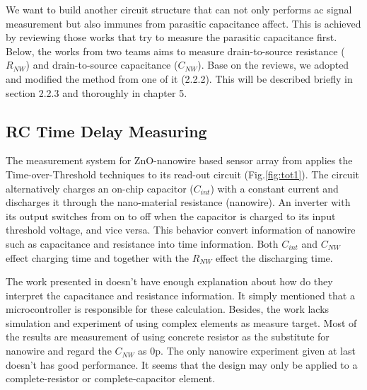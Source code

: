 We want to build another circuit structure that can not only performs ac signal measurement but also immunes from parasitic capacitance affect.
This is achieved by reviewing those works that try to measure the parasitic capacitance first.
Below, the works from two teams aims to measure drain-to-source resistance ($R_{NW}$) and drain-to-source capacitance ($C_{NW}$).
Base on the reviews, we adopted and modified the method from one of it (2.2.2).
This will be described briefly in section 2.2.3 and thoroughly in chapter 5.

\subsection{RC Time Delay Measuring}
The measurement system for ZnO-nanowire based sensor array from \cite{Juv1} applies the Time-over-Threshold techniques to its read-out circuit (Fig.\ref{fig:tot1}).
The circuit alternatively charges an on-chip capacitor ($C_{int}$) with a constant current and discharges it through the nano-material resistance (nanowire).
An inverter with its output switches from on to off when the capacitor is charged to its input threshold voltage, and vice versa.
This behavior convert information of nanowire such as capacitance and resistance into time information.
Both $C_{int}$ and $C_{NW}$ effect charging time and together with the $R_{NW}$ effect the discharging time.

The work presented in \cite{Juv1} doesn't have enough explanation about how do they interpret the capacitance and resistance information.
It simply mentioned that a microcontroller is responsible for these calculation.
Besides, the work lacks simulation and experiment of using complex elements as measure target.
Most of the results are measurement of using concrete resistor as the substitute for nanowire and regard the $C_{NW}$ as 0p.
The only nanowire experiment given at last doesn't has good performance.
It seems that the design may only be applied to a complete-resistor or complete-capacitor element.

